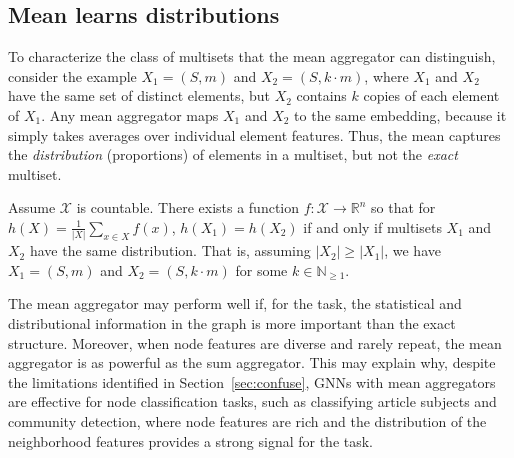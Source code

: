 \subsection{Mean learns distributions}
To characterize the class of multisets that the mean aggregator can distinguish, consider the example $X_1 = (S, m)$ and $X_2 = (S, k \cdot m)$, where $X_1$ and $X_2$ have the same set of distinct elements, but $X_2$ contains $k$ copies of each element of $X_1$. Any mean aggregator maps $X_1$ and $X_2$ to the same embedding, because it simply takes averages over individual element features. %
Thus, the mean captures the \textit{distribution} (proportions) of elements in a multiset, but not the \textit{exact} multiset. %
%

\begin{corollary} \label{theorem:mean}
Assume $\mathcal{X}$ is countable. There exists a function $f:\mathcal{X}\rightarrow\mathbb{R}^n$ so that for $h(X) =  \frac{1}{|X|}  \sum_{x \in X} f(x)$, $h(X_1) = h(X_2)$ if and only if multisets $X_1 $ and $X_2$ have the same distribution. That is, assuming $|X_2| \geq |X_1|$, we have $X_1 = (S, m)$ and $X_2 = (S, k \cdot m)$ for some $k \in \mathbb{N}_{\geq 1}$.
\end{corollary}
 \vspace{-0.02in}
%
The mean aggregator may perform well if, for the task, the statistical and distributional information in the graph is more important than the exact structure. Moreover, when node features are diverse and rarely repeat, the mean aggregator is as powerful as the sum aggregator. This may explain why, despite the limitations identified in Section~\ref{sec:confuse}, GNNs with mean aggregators are effective for node classification tasks, such as classifying article subjects and community detection, where node features are rich and the distribution of the neighborhood features provides a strong signal for the task.


